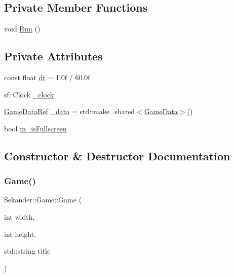 \subsection*{Private Member Functions}
\begin{DoxyCompactItemize}
\item 
void \hyperlink{classSekander_1_1Game_ac944cfcfb5783b7788e591cd748ee51e}{Run} ()
\end{DoxyCompactItemize}
\subsection*{Private Attributes}
\begin{DoxyCompactItemize}
\item 
const float \hyperlink{classSekander_1_1Game_ad38a233b0015262e84bd4f200378c295}{dt} = 1.\+0f / 60.\+0f
\item 
sf\+::\+Clock \hyperlink{classSekander_1_1Game_a834d5264e03e48eb2cf4fbc11e46b58d}{\+\_\+clock}
\item 
\hyperlink{namespaceSekander_a1d69b002ba2d23020901c28f0def5e16}{Game\+Data\+Ref} \hyperlink{classSekander_1_1Game_a2a48d9df37ee8bb23b687a7f9c83a471}{\+\_\+data} = std\+::make\+\_\+shared$<$\hyperlink{structSekander_1_1GameData}{Game\+Data}$>$()
\item 
bool \hyperlink{classSekander_1_1Game_a416e310b39c99a719a9429b8366e7a0b}{m\+\_\+is\+Fullscreen}
\end{DoxyCompactItemize}


\subsection{Constructor \& Destructor Documentation}
\mbox{\label{classSekander_1_1Game_a53c182b8b8b63723740aaef1b0cc25a0}} 
\subsubsection{\texorpdfstring{Game()}{Game()}\hspace{0.1cm}{\footnotesize\ttfamily [1/3]}}
{\footnotesize\ttfamily Sekander\+::\+Game\+::\+Game (\begin{DoxyParamCaption}\item[{int}]{width,  }\item[{int}]{height,  }\item[{std\+::string}]{title }\end{DoxyParamCaption})}

